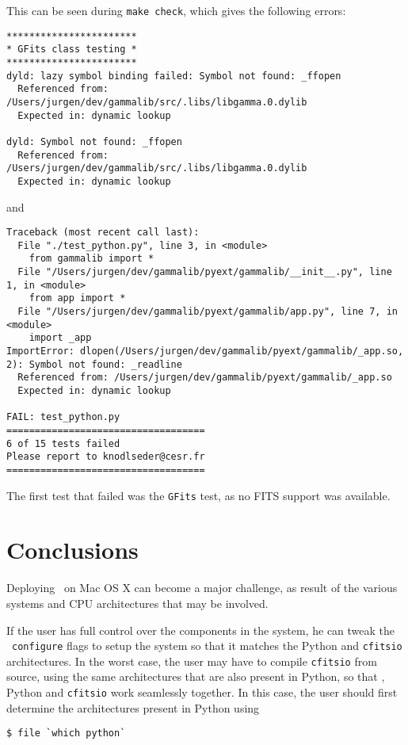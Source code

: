 \documentclass{article}[12pt,a4]
\begin{document}
This can be seen during {\tt make check}, which gives the following errors:
\begin{verbatim}
***********************
* GFits class testing *
***********************
dyld: lazy symbol binding failed: Symbol not found: _ffopen
  Referenced from: /Users/jurgen/dev/gammalib/src/.libs/libgamma.0.dylib
  Expected in: dynamic lookup

dyld: Symbol not found: _ffopen
  Referenced from: /Users/jurgen/dev/gammalib/src/.libs/libgamma.0.dylib
  Expected in: dynamic lookup
\end{verbatim}
and
\begin{verbatim}
Traceback (most recent call last):
  File "./test_python.py", line 3, in <module>
    from gammalib import *
  File "/Users/jurgen/dev/gammalib/pyext/gammalib/__init__.py", line 1, in <module>
    from app import *
  File "/Users/jurgen/dev/gammalib/pyext/gammalib/app.py", line 7, in <module>
    import _app
ImportError: dlopen(/Users/jurgen/dev/gammalib/pyext/gammalib/_app.so, 2): Symbol not found: _readline
  Referenced from: /Users/jurgen/dev/gammalib/pyext/gammalib/_app.so
  Expected in: dynamic lookup

FAIL: test_python.py
===================================
6 of 15 tests failed
Please report to knodlseder@cesr.fr
===================================
\end{verbatim}
The first test that failed was the {\tt GFits} test, as no FITS support was available.


\section{Conclusions}

Deploying \this\ on Mac OS X can become a major challenge, as result of the various systems
and CPU architectures that may be involved.

If the user has full control over the components in the system, he can tweak the \this\ {\tt configure}
flags to setup the system so that it matches the Python and {\tt cfitsio} architectures.
In the worst case, the user may have to compile {\tt cfitsio} from source, using the same architectures
that are also present in Python, so that \this, Python and {\tt cfitsio} work seamlessly together.
In this case, the user should first determine the architectures present in Python using
\begin{verbatim}
$ file `which python`
\end{verbatim}
\end{document}
